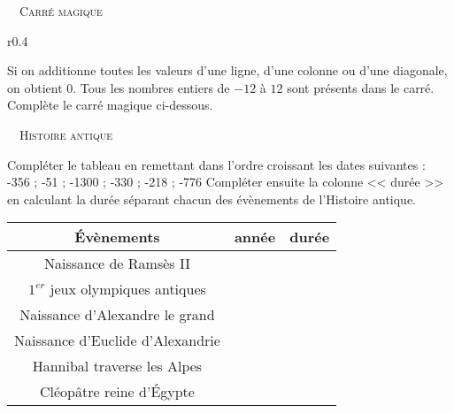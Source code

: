 \documentclass[../Cours.tex]{subfiles}
\begin{document}
\begin{questions}
    \exercice ~~\textsc{Carré magique}\\
    
    \begin{wrapfigure}{r}{0.4\linewidth}
    \vspace{-1cm}
    \end{wrapfigure}
    
    Si on additionne toutes les valeurs d'une ligne, d'une colonne ou d'une diagonale, on obtient 0. Tous les nombres entiers de $-12$ à $12$ sont présents dans le carré.\\
    Complète le carré magique ci-dessous.
    
    \vspace{2cm}
    \exercice ~~\textsc{Histoire antique}
    
    \question Compléter le tableau en remettant dans l'ordre croissant les dates suivantes : \\-356 ; -51 ; -1300 ; -330 ; -218 ; -776
    \question Compléter ensuite la colonne << durée >> en calculant la durée séparant chacun des évènements de l'Histoire antique.
    \begin{center}
    \begin{tabular}{|c|c|c|}\hline
    Évènements & année & durée \\\hline
    Naissance de Ramsès II  & & \\\hline
    $1^{er}$ jeux olympiques antiques  & & \\\hline
    Naissance d'Alexandre le grand & & \\\hline
    Naissance d'Euclide d'Alexandrie & & \\\hline
    Hannibal traverse les Alpes & & \\\hline
    Cléopâtre reine d'Égypte & & \\\hline
    \end{tabular}
    \end{center}
\end{questions}
\end{document}
